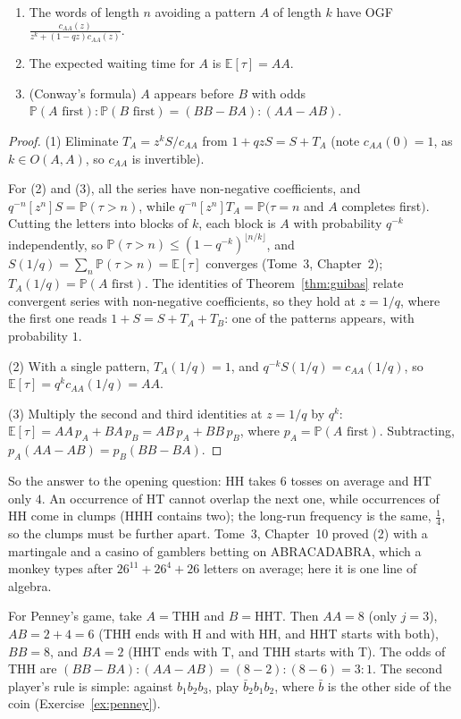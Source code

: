 \begin{corollary}\label{cor:penney}
\begin{enumerate}
\item The words of length $n$ avoiding a pattern $A$ of length $k$ have OGF $\displaystyle\frac{c_{AA}(z)}{z^k+(1-qz)c_{AA}(z)}$.
\item The expected waiting time for $A$ is $\mathbb E[\tau]=AA$.
\item (Conway's formula) $A$ appears before $B$ with odds $\mathbb P(A\text{ first}):\mathbb P(B\text{ first})=(BB-BA):(AA-AB)$.
\end{enumerate}
\end{corollary}
\begin{proof}
(1) Eliminate $T_A=z^kS/c_{AA}$ from $1+qzS=S+T_A$ (note $c_{AA}(0)=1$, as $k\in O(A,A)$, so $c_{AA}$ is invertible).

For (2) and (3), all the series have non-negative coefficients, and $q^{-n}[z^n]S=\mathbb P(\tau>n)$, while $q^{-n}[z^n]T_A=\mathbb P(\tau=n$ and $A$ completes first$)$. Cutting the
letters into blocks of $k$, each block is $A$ with probability $q^{-k}$ independently, so $\mathbb P(\tau>n)\le(1-q^{-k})^{\lfloor n/k\rfloor}$, and $S(1/q)=\sum_n\mathbb P(\tau>n)=\mathbb E[\tau]$
converges (Tome~3, Chapter~2); $T_A(1/q)=\mathbb P(A\text{ first})$. The identities of Theorem~\ref{thm:guibas} relate convergent series with non-negative
coefficients, so they hold at $z=1/q$, where the first one reads $1+S=S+T_A+T_B$: one of the patterns appears, with probability $1$.

(2) With a single pattern, $T_A(1/q)=1$, and $q^{-k}S(1/q)=c_{AA}(1/q)$, so $\mathbb E[\tau]=q^kc_{AA}(1/q)=AA$.

(3) Multiply the second and third identities at $z=1/q$ by $q^k$: $\mathbb E[\tau]=AA\,p_A+BA\,p_B=AB\,p_A+BB\,p_B$, where $p_A=\mathbb P(A\text{ first})$. Subtracting,
$p_A(AA-AB)=p_B(BB-BA)$.
\end{proof}

So the answer to the opening question: HH takes $6$ tosses on average and HT only $4$. An occurrence of HT cannot overlap the next one, while
occurrences of HH come in clumps (HHH contains two); the long-run frequency is the same, $\frac14$, so the clumps must be further
apart. Tome~3, Chapter~10 proved (2) with a martingale and a casino of gamblers betting on ABRACADABRA, which a monkey types after
$26^{11}+26^4+26$ letters on average; here it is one line of algebra.

For Penney's game, take $A=\mathrm{THH}$ and $B=\mathrm{HHT}$. Then $AA=8$ (only $j=3$), $AB=2+4=6$ (THH ends with H and with HH, and HHT starts with
both), $BB=8$, and $BA=2$ (HHT ends with T, and THH starts with T). The odds of THH are $(BB-BA):(AA-AB)=(8-2):(8-6)=3:1$. The second player's rule is simple: against $b_1b_2b_3$, play $\bar b_2b_1b_2$, where $\bar b$ is the other side of the coin
(Exercise~\ref{ex:penney}).

